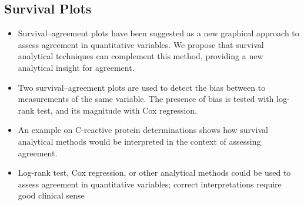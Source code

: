 \documentclass[Chap2bmain.tex]{subfiles}
\begin{document}
\subsection{Survival Plots}

\begin{itemize}

\item Survival–agreement plots have been suggested as a new graphical approach to assess agreement in
quantitative variables. We propose that survival analytical techniques can complement this method, providing a new analytical insight
for agreement.


\item Two survival–agreement plots are used to detect the bias between to measurements of the same variable. The presence of
bias is tested with log-rank test, and its magnitude with Cox regression.

\item An example on C-reactive protein determinations shows how survival analytical methods would be interpreted in the context
of assessing agreement.

\item Log-rank test, Cox regression, or other analytical methods could be used to assess agreement in quantitative variables;
correct interpretations require good clinical sense

\end{itemize}
\end{document}
